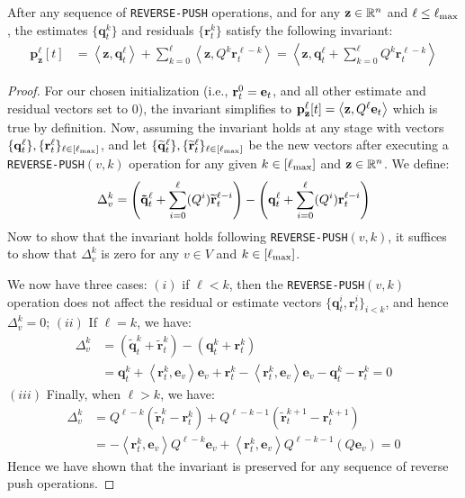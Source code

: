 \begin{lemma}
\label{lem:pushinvariant}
After any sequence of \texttt{REVERSE-PUSH} operations, and for any $\mathbf{z}\in\mathbb{R}^n$ and $\ell\leq\ell_{\max}$, the estimates $\{\mathbf{q}_t^k\}$ and residuals $\{\mathbf{r}_t^k\}$  satisfy the following invariant:
\begin{align*}
\mathbf{p}_\mathbf{z}^{\ell}[t] &= \left< \mathbf{z}, \mathbf{q}_t^{\ell} \right> + \sum_{k=0}^{\ell} \left<\mathbf{z}, Q^k\mathbf{r}_t^{\ell-k}\right> = \left< \mathbf{z}, \mathbf{q}_t^{\ell}  + \sum_{k=0}^{\ell} Q^k\mathbf{r}_t^{\ell-k}\right>
\end{align*}
\end{lemma}

\begin{proof}
For our chosen initialization (i.e., $\mathbf{r}^{0}_t = \mathbf{e}_t$, and all other estimate and residual vectors set to $0$), the invariant simplifies to $\mathbf{p}_\mathbf{z}^{\ell}[t] = \left< \mathbf{z} , Q^{\ell}\mathbf{e}_t \right>$ which is true by definition.
Now, assuming the invariant holds at any stage with vectors $\{\mathbf{q}^{\ell}_t\}, \{\mathbf{r}^{\ell}_t\}_{\ell\in[\ell_{\max}]}$, and let $\{\widetilde{\mathbf{q}}^{\ell}_t\}, \{\widetilde{\mathbf{r}}^{\ell}_t\}_{\ell\in[\ell_{\max}]}$ be the new vectors after executing a \texttt{REVERSE-PUSH}$(v,k)$ operation for any given $k\in[\ell_{\max}]$ and $\mathbf{z}\in\mathbb{R}^n$. We define:
$$\Delta_v^{k} = \left( \mathbf{\tilde{q}}_t^{\ell} + \sum_{i=0}^{\ell}  (Q^i)\widetilde{\mathbf{r}}^{\ell-i}_t \right)- \left( \mathbf{q}^{\ell}_t + \sum_{i=0}^{\ell}  (Q^i) \mathbf{r}_t^{\ell-i}\right)$$
Now to show that the invariant holds following \texttt{REVERSE-PUSH}$(v,k)$, it suffices to show that $\Delta_v^{k}$ is zero for any $v\in V$ and $k\in[\ell_{\max}]$. 

We now have three cases: $(i)$ if $\ell < k$, then the \texttt{REVERSE-PUSH}$(v,k)$ operation does not affect the residual or estimate vectors $\{\mathbf{q}_t^{i},\mathbf{r}_t^{i}\}_{i<k}$, and hence 
$\Delta_v^k=0$;
$(ii)$ If $\ell = k$, we have:
\begin{align*}
\Delta_v^{k} &= \left( \mathbf{\tilde{q}}_t^{k} +  \mathbf{\tilde{r}}_t^{k}\right)- \left( \mathbf{q}_t^{k} + \mathbf{r}_t^{k}\right)\\
&= \mathbf{q}_t^{k} + \left<\mathbf{r}_t^{k}, \mathbf{e}_v \right>\mathbf{e}_v +  \mathbf{r}_t^{k} - \left<\mathbf{r}_t^{k}, \mathbf{e}_v \right>\mathbf{e}_v - \mathbf{q}_t^{k} - \mathbf{r}_t^{k}
= 0
\end{align*}
$(iii)$ Finally, when $\ell > k$, we have: 
\begin{align*}
\Delta_v^k &= Q^{\ell-k}\left( \mathbf{\tilde{r}}_t^k - \mathbf{r}_t^k \right) + Q^{\ell-k-1}\left( \mathbf{\tilde{r}}_t^{k+1} - \mathbf{r}_t^{k+1} \right)\\
&= -\left<\mathbf{r}_t^k, \mathbf{e}_v \right>Q^{\ell-k}\mathbf{e}_v  + \left<\mathbf{r}_t^k, \mathbf{e}_v \right>Q^{\ell-k-1}\left(Q\mathbf{e}_v \right)
= 0
\end{align*}
Hence we have shown that the invariant is preserved for any sequence of reverse push operations.
\end{proof}

